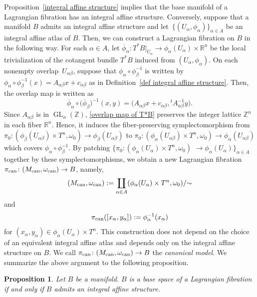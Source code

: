 \documentclass[10pt,a4paper]{amsart}
\numberwithin{equation}{section}
\newtheorem{Proposition}[Theorem]{Proposition}
 { \theoremstyle{definition}
\newtheorem{Definition}[Theorem]{Definition}
\newtheorem{Note}[Theorem]{Note}
\newtheorem{Example}[Theorem]{Example}
\newtheorem{Remark}[Theorem]{Remark} }
\newcommand{\R}{\mathbb{R}}
\newcommand{\Z}{\mathbb{Z}}
\def\GL{\operatorname{GL}}
\begin{document}
Proposition~\ref{integral affine structure} implies that the base manifold of a Lagrangian fibration has an integral affine structure.
Conversely, suppose that a manifold $B$ admits an integral affine structure and let~$\{ (U_\alpha,\phi_\alpha)\}_{\alpha\in A}$ be an integral affine atlas of $B$. Then, we can construct a Lagrangian fibration on $B$ in the following way. For each $\alpha \in A$, let $\overline \phi_\alpha\colon T^*B|_{U_\alpha}\to \phi_\alpha(U_\alpha) \times \R^n$ be the local trivialization of the cotangent bundle $T^*B$ induced from $(U_\alpha,\phi_\alpha)$. On each nonempty overlap~$U_{\alpha\beta}$, suppose that $\phi_{\alpha}\circ \phi_{\beta}^{-1}$ is written by $\phi_{\alpha}\circ \phi_{\beta}^{-1}(x)=A_{\alpha\beta}x+c_{\alpha\beta}$ as in Definition~\ref{def integral affine structure}. Then, the overlap map is written as
\begin{equation}\label{overlap map of T*B}
\overline\phi_\alpha\circ \bigl(\overline\phi_\beta\bigr)^{-1}(x,y)=\bigl(A_{\alpha\beta}x+c_{\alpha\beta},{}^tA^{-1}_{\alpha\beta}y\bigr).
\end{equation}
Since $A_{\alpha\beta}$ is in $\GL_n(\Z)$, \eqref{overlap map of T*B} preserves the integer lattice $\Z^n$ in each fiber $\R^n$. Hence, it induces the fiber-preserving symplectomorphism from $\pi_0\colon(\phi_\beta(U_{\alpha\beta})\times T^n,\omega_0)\to \phi_\beta(U_{\alpha\beta})$ to $\pi_0\colon (\phi_\alpha(U_{\alpha\beta})\times T^n,\omega_0)\to \phi_\alpha(U_{\alpha\beta})$ which covers $\phi_{\alpha}\circ \phi_{\beta}^{-1}$. By patching $\{\pi_0\colon (\phi_{\alpha}(U_\alpha)\times T^n, \omega_0)$ $\to \phi_\alpha(U_\alpha)\}_{\alpha\in A}$ together by these symplectomorphisms, we obtain a new Lagrangian fibration $\pi_{\rm can}\colon (M_{\rm can},\omega_{\rm can})\to B$, namely,
\[
(M_{\rm can},\omega_{\rm can}):=\coprod_{\alpha\in A}(\phi_\alpha(U_\alpha)\times T^n, \omega_0)/{\sim}
\]
and
\[
\pi_{\rm can}([x_\alpha,y_\alpha]):=\phi_\alpha^{-1}(x_\alpha)
\]
for $(x_\alpha,y_\alpha)\in \phi_\alpha(U_\alpha)\times T^n$. This construction does not depend on the choice of an equivalent integral affine atlas and depends only on the integral affine structure on $B$.
We call $\pi_{\rm can}\colon (M_{\rm can},\omega_{\rm can})\to B$ the {\it canonical model}.
%
We summarize the above argument to the following proposition.
\begin{Proposition}\label{necessary and sufficient condition}
Let $B$ be a manifold. $B$ is a base space of a Lagrangian fibration if and only if $B$ admits an integral affine structure.
\end{Proposition}
\end{document}
